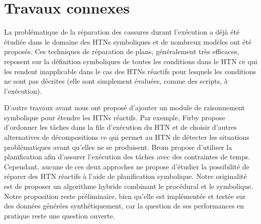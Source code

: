 \documentclass[a4paper,twoside,french]{article}
\begin{document}
		\section{Travaux connexes}
		La problématique de la réparation des cassures durant l'exécution a déjà été étudiée dans le domaine des HTNs symboliques et de nombreux modèles ont été proposés\cite{boella2002replanning,van2005plan,ayan2007hotride,warfield2007adaptation}. Ces techniques de réparation de plans, généralement très efficaces, reposent sur la définition symboliques de toutes les conditions dans le HTN ce qui les rendent inapplicable dans le cas des HTNs réactifs pour lesquels les conditions ne sont pas décrites (elle sont simplement évaluées, comme des scripts, à l'exécution).
		\par D'autre travaux avant nous ont proposé d'ajouter un module de raisonnement symbolique pour étendre les HTNs réactifs. Par exemple, Firby \cite{firby1987investigation} propose d'ordonner les tâches dans la file d'exécution du HTN et de choisir d'autres alternatives de décompositions ce qui permet au HTN de détecter les situations problématiques avant qu'elles ne se produisent. Brom \cite{brom2005hierarchical} propose d'utiliser la planification afin d'assurer l'exécution des tâches avec des contraintes de temps. Cependant, aucune de ces deux approches ne propose d'étudier la possibilité de réparer des HTN réactifs à l'aide de planification symbolique. Notre originalité est de proposer un algorithme hybride combinant le procédural et le symbolique. Notre proposition reste préliminaire, bien qu'elle est implémentée et testée sur des données générées synthétiquement, car la question de ses performances en pratique reste une question ouverte. 
\end{document}
